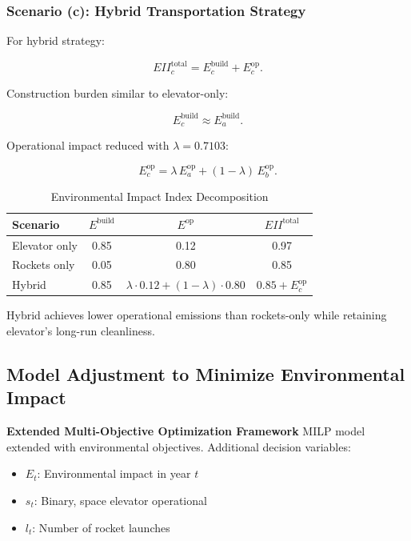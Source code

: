 \documentclass[12pt]{mcmthesis}
\begin{document}
\subsubsection{Scenario (c): Hybrid Transportation Strategy}

For hybrid strategy:

\[
    EII_c^{\text{total}} = E_c^{\text{build}} + E_c^{\text{op}}.
\]

Construction burden similar to elevator-only:

\vspace{-10pt}
\[
    E_c^{\text{build}} \approx E_a^{\text{build}}.
\]
\vspace{-10pt}

Operational impact reduced with $\lambda=0.7103$:

\vspace{-10pt}
\[
    E_c^{\text{op}} = \lambda\,E_a^{\text{op}} + (1-\lambda)\,E_b^{\text{op}}.
\]
\vspace{-10pt}

\begin{table}[htbp]
    \centering
    \caption{Environmental Impact Index Decomposition}
    \label{tab:eii_decomposition}
    \begin{tabular}{lccc}
        \toprule
        \textbf{Scenario} & $E^{\text{build}}$ & $E^{\text{op}}$                           & $EII^{\text{total}}$   \\
        \midrule
        Elevator only     & 0.85               & 0.12                                      & 0.97                   \\
        Rockets only      & 0.05               & 0.80                                      & 0.85                   \\
        Hybrid            & 0.85               & $\lambda\cdot 0.12+(1-\lambda)\cdot 0.80$ & $0.85+E_c^{\text{op}}$ \\
        \bottomrule
    \end{tabular}
\end{table}

Hybrid achieves lower operational emissions than rockets-only while retaining elevator's long-run cleanliness.

\subsection{Model Adjustment to Minimize Environmental Impact}

\textbf{Extended Multi-Objective Optimization Framework}
MILP model extended with environmental objectives. Additional decision variables:
\begin{itemize}
    \item $E_t$: Environmental impact in year $t$
    \item $s_t$: Binary, space elevator operational
    \item $l_t$: Number of rocket launches
\end{itemize}
\end{document}
